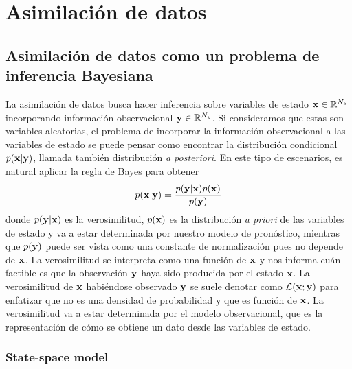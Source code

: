 \chapter{Asimilación de datos} \label{chp:da}


\section{Asimilación de datos como un problema de inferencia Bayesiana}

La asimilación de datos busca hacer inferencia sobre variables de estado $\mathbf{x} \in \mathbb R^{N_x}$ incorporando información observacional $\mathbf{y} \in \mathbb R^{N_y}$. Si consideramos que estas son variables aleatorias, el problema de incorporar la información observacional a las variables de estado se puede pensar como encontrar la distribución condicional $p(\mathbf{x} | \mathbf{y})$, llamada también distribución \textit{a posteriori}. En este tipo de escenarios, es natural aplicar la regla de Bayes para obtener
\begin{align*}
    p(\mathbf{x} | \mathbf{y}) = \frac{p(\mathbf{y} | \mathbf{x})p(\mathbf{x})}{p(\mathbf{y})}
\end{align*}
donde $p(\mathbf{y} | \mathbf{x})$ es la verosimilitud, $p(\mathbf{x})$ es la distribución \textit{a priori} de las variables de estado y va a estar determinada por nuestro modelo de pronóstico, mientras que $p(\mathbf{y})$ puede ser vista como una constante de normalización pues no depende de $\mathbf{x}$. La verosimilitud se interpreta como una función de $\mathbf{x}$ y nos informa cuán factible es que la observación $\mathbf{y}$ haya sido producida por el estado $\mathbf{x}$. La verosimilitud de $\mathbf{x}$ habiéndose observado $\mathbf{y}$ se suele denotar como $\mathcal{L}(\mathbf{x} ; \mathbf{y})$ para enfatizar que no es una densidad de probabilidad y que es función de $\mathbf{x}$. La verosimilitud va a estar determinada por el modelo observacional, que es la representación de cómo se obtiene un dato desde las variables de estado.

\subsection{State-space model}

